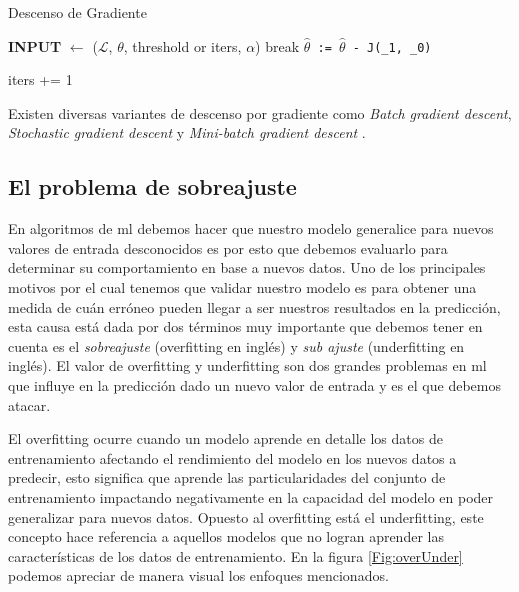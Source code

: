 
\begin{algorithm}[H] \caption{Descenso de Gradiente}\label{euclid}
\begin{algorithmic}[1]
\State \textbf{INPUT} $\gets$ ($\mathcal{L}$, $\theta$, threshold or iters, $\alpha$)
	\State	break
\Else
	\State \texttt{$\hat\theta$ := $\hat\theta$ - \alpha \frac{\partial}{\partial \theta} J(\theta_{1}, \theta_{0})}
	
\EndIf
\State iters += 1
\EndWhile
\end{algorithmic}
\end{algorithm}


Existen diversas variantes de descenso por gradiente como \textit{Batch gradient descent}, \textit{Stochastic gradient descent} y \textit{Mini-batch gradient descent} \citep{variants_gd}.

\subsection{El problema de sobreajuste}\label{sub:validacion-modelo}

En algoritmos de \ac{ml} debemos hacer que nuestro modelo generalice para nuevos valores de entrada desconocidos es por esto que debemos evaluarlo para determinar su comportamiento en base a nuevos datos. Uno de los principales motivos por el cual tenemos que validar nuestro modelo es para obtener una medida de cuán erróneo pueden llegar a ser nuestros resultados en la predicción, esta causa está dada por dos términos muy importante que debemos tener en cuenta es el \textit{sobreajuste} (overfitting en inglés) y \textit{sub ajuste} (underfitting en inglés). El valor de overfitting y underfitting son dos grandes problemas en \ac{ml} que influye en la predicción dado un nuevo valor de entrada y es el que debemos atacar. 

El overfitting ocurre cuando un modelo aprende en detalle los datos de entrenamiento afectando el rendimiento del modelo en los nuevos datos a predecir, esto significa que aprende las particularidades del conjunto de entrenamiento impactando negativamente en la capacidad del modelo en poder generalizar para nuevos datos. Opuesto al overfitting está el  underfitting, este concepto hace referencia a aquellos modelos que no logran aprender las características de los datos de entrenamiento. En la figura \ref{Fig:overUnder} podemos apreciar de manera visual los enfoques mencionados.

